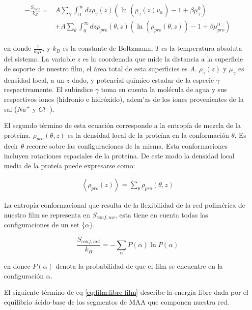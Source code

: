 \begin{align}
	\begin{aligned}
		-\frac{S_{mez}}{k_B}= &A\sum_{\gamma}\int_0^\infty{dz\rho_\gamma(z)\left(\ln \left(\rho_\gamma (z)v_w\right) -1 + \beta\mu^0_\gamma\right)} \\
		&+ A\sum_{\theta}\int_0^\infty{dz\rho_{pro}(\theta,z)\left(\ln \left(\rho_{pro}(\theta,z)\right) -1 + \beta\mu^0_{pro} \right)}
	\end{aligned}
\end{align}

\noindent en donde $\frac{1}{k_B T}$, y $k_B$ es la constante de Boltzmann, $T$ es la temperatura absoluta del sistema. La variable $z$ es la coordenada que mide la distancia a la superficie de soporte de nuestro film, el \'area total de esta superficies es $A$. $\rho_\gamma(z)$ y $\mu_\gamma$ es densidad local, a un $z$ dado, y potencial qu\'imico estadar de la especie $\gamma$ respectivamente.
El sub\'indice $\gamma$ toma en cuenta la mol\'ecula de agua y sus respectivos iones (hidronio e hidr\'oxido), adem'as de los iones provenientes de la sal ($Na^+$ y $Cl^-$). 


El segundo t\'ermino de esta ecuaci\'on corresponde a la entrop\'ia de mezcla de la prote\'ina. $\rho_{pro}(\theta,z)$ es la densidad local de la prote\'ina en la conformaci\'on $\theta$. Es decir $\theta$ recorre sobre las configuraciones de la misma.
Esta conformaciones incluyen rotaciones espaciales de la prote\'ina.
De este modo la densidad local media de la prote\'ia puede expresarse como:


\begin{align}
	\left<\rho_{pro}(z)\right> = \sum_\theta{\rho_{pro}(\theta,z)}
\end{align}


La entrop\'ia conformacional que resulta de la flexibilidad de la red polim\'erica de nuestro film se representa en $S_{conf, nw}$, esta tiene en cuenta todas las configuraciones de un set $\{\alpha\}$.

\begin{equation}
	\frac{S_{conf,net}}{k_B} = - \sum_{\alpha}{P(\alpha)\ln P(\alpha)}
\end{equation}

\noindent en donce $P(\alpha)$ denota la probabilidad de que el film se encuentre en la configuraci\'on $\alpha$.

El siguiente t\'ermino de eq \ref{eq:film:libre-film} describe  la energ\'ia libre dada por  el equilibrio \'acido-base de los segmentos de MAA que componen nuestra red. 

